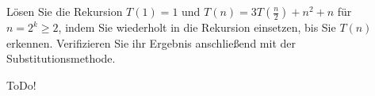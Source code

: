 
\begin{exercise}

Lösen Sie die Rekursion $T(1) = 1$ und $T(n) = 3T(\frac{n}{2}) + n^2 + n$ für $n = 2^k \geq 2$, indem Sie wiederholt in die Rekursion einsetzen, bis Sie $T(n)$ erkennen. Verifizieren Sie ihr Ergebnis anschließend mit der Substitutionsmethode.

\end{exercise}


\begin{solution}

ToDo!

\end{solution}

